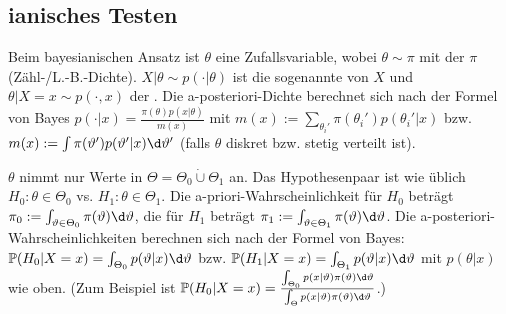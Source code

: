 \pagebreak

\subsection{%
    ianisches Testen%
}

\begin{Bem}
    Beim bayesianischen Ansatz ist $\theta$ eine Zufallsvariable,
    wobei $\theta \sim \pi$ mit der  $\pi$ (Zähl-/L.-B.-Dichte).
    $X|\theta \sim p(\cdot|\theta)$ ist die sogenannte  von $X$ und
    $\theta|X=x \sim p(\cdot,x)$ der .
    Die a-posteriori-Dichte berechnet sich nach der Formel von Bayes
    $p(\cdot|x) = \frac{\pi(\theta) p(x|\theta)}{m(x)}$ mit
    $m(x) := \sum_{\theta_i'} \pi(\theta_i') p(\theta_i'|x)$ bzw.
    $m(x) := \int \pi(\theta') p(\theta'|x) \d\theta'$
    (falls $\theta$ diskret bzw. stetig verteilt ist).

    $\theta$ nimmt nur Werte in $\Theta = \Theta_0 \mathbin{\dot{\cup}} \Theta_1$ an.
    Das Hypothesenpaar ist wie üblich $H_0\colon \theta \in \Theta_0$ vs.
    $H_1\colon \theta \in \Theta_1$.
    Die a-priori-Wahrscheinlichkeit für $H_0$ beträgt
    $\pi_0 := \int_{\theta \in \Theta_0} \pi(\theta)\d\theta$,
    die für $H_1$ beträgt $\pi_1 := \int_{\theta \in \Theta_1} \pi(\theta)\d\theta$.
    Die a-posteriori-Wahrscheinlichkeiten berechnen sich nach der Formel von Bayes:
    $\PP(H_0|X=x) = \int_{\Theta_0} p(\theta|x)\d\theta$ bzw.
    $\PP(H_1|X=x) = \int_{\Theta_1} p(\theta|x)\d\theta$
    mit $p(\theta|x)$ wie oben.
    (Zum Beispiel ist $\PP(H_0|X=x) = \frac{\int_{\Theta_0} p(x|\theta)\pi(\theta)\d\theta}
    {\int_\Theta p(x|\theta)\pi(\theta)\d\theta}$.)
\end{Bem}

\linie

